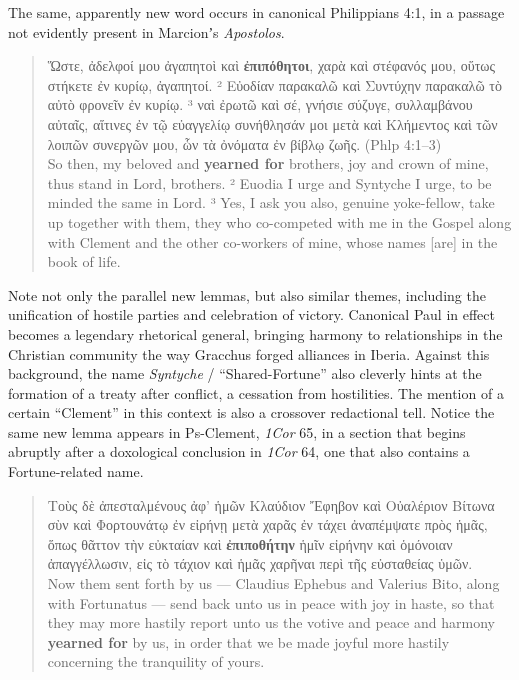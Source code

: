 \noindent{}The same, apparently new word occurs in canonical Philippians 4:1, %
in a passage not evidently present in Marcionʼs \textit{Apostolos}. %

\vspace*{3mm} 
 \begin{quote} Ὥστε, ἀδελφοί μου ἀγαπητοὶ καὶ \textbf{ἐπιπόθητοι}, %
    χαρὰ καὶ στέφανός μου, οὕτως στήκετε ἐν κυρίῳ, ἀγαπητοί. %
  ² Εὐοδίαν παρακαλῶ καὶ Συντύχην παρακαλῶ τὸ αὐτὸ φρονεῖν ἐν κυρίῳ. %
  ³ ναὶ ἐρωτῶ καὶ σέ, γνήσιε σύζυγε, συλλαμβάνου αὐταῖς, %
  αἵτινες ἐν τῷ εὐαγγελίῳ συνήθλησάν μοι μετὰ καὶ Κλήμεντος %
  καὶ τῶν λοιπῶν συνεργῶν μου, ὧν τὰ ὀνόματα ἐν βίβλῳ ζωῆς. (Phlp 4:1--3) \\[1mm] %
  So then, my beloved and \textbf{yearned for} brothers, joy and crown of mine, thus stand in Lord, brothers. %
  ² Euodia I urge and Syntyche I urge, to be minded the same in Lord. %
  ³ Yes, I ask you also, genuine yoke-fellow, take up together with them, %
  they who co-competed with me in the Gospel along with Clement and the other co-workers of mine, %
  whose names [are] in the book of life. \end{quote} %
 \vspace*{3mm}

Note not only the parallel new lemmas, %
but also similar themes, including the unification of hostile parties and celebration of victory. %
Canonical Paul in effect becomes a legendary rhetorical general, %
bringing harmony to relationships in the Christian community %
the way Gracchus forged alliances in Iberia. %
Against this background, the name \textit{Syntyche} / “Shared-Fortune” %
also cleverly hints at the formation of a treaty after conflict, a cessation from hostilities. %
The mention of a certain “Clement” in this context is also a crossover redactional tell. %
Notice the same new lemma appears in Ps-Clement, \textit{1Cor} 65, %
in a section that begins abruptly after a doxological conclusion in \textit{1Cor} 64, %
one that also contains a Fortune-related name. %

\vspace*{3mm} 
 \begin{quote}Τοὺς δὲ ἀπεσταλμένους ἀφ’ ἡμῶν Κλαύδιον Ἔφηβον καὶ Οὐαλέριον Βίτωνα %
 σὺν καὶ Φορτουνάτῳ ἐν εἰρήνῃ μετὰ χαρᾶς ἐν τάχει ἀναπέμψατε πρὸς ἡμᾶς, %
 ὅπως θᾶττον τὴν εὐκταίαν καὶ \textbf{ἐπιποθήτην} ἡμῖν εἰρήνην καὶ ὁμόνοιαν ἀπαγγέλλωσιν, %
 εἰς τὸ τάχιον καὶ ἡμᾶς χαρῆναι περὶ τῆς εὐσταθείας ὑμῶν. \\[1mm] %
 Now them sent forth by us --- Claudius Ephebus and Valerius Bito, %
 along with Fortunatus --- send back unto us in peace with joy in haste, %
 so that they may more hastily report unto us the votive and peace and harmony \textbf{yearned for} by us, %
 in order that we be made joyful more hastily concerning the tranquility of yours. \end{quote} %
 \vspace*{3mm}

